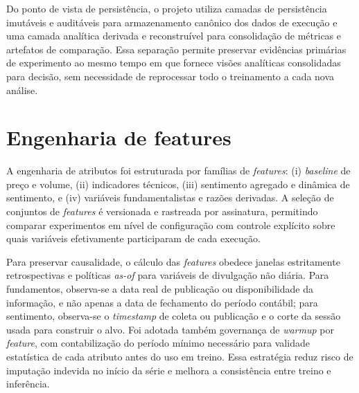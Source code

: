 Do ponto de vista de persistência, o projeto utiliza camadas de persistência imutáveis e auditáveis para armazenamento canônico dos dados de execução e uma camada analítica derivada e reconstruível para consolidação de métricas e artefatos de comparação. Essa separação permite preservar evidências primárias de experimento ao mesmo tempo em que fornece visões analíticas consolidadas para decisão, sem necessidade de reprocessar todo o treinamento a cada nova análise.

\section{Engenharia de features}
A engenharia de atributos foi estruturada por famílias de \textit{features}: (i) \textit{baseline} de preço e volume, (ii) indicadores técnicos, (iii) sentimento agregado e dinâmica de sentimento, e (iv) variáveis fundamentalistas e razões derivadas. A seleção de conjuntos de \textit{features} é versionada e rastreada por assinatura, permitindo comparar experimentos em nível de configuração com controle explícito sobre quais variáveis efetivamente participaram de cada execução.

Para preservar causalidade, o cálculo das \textit{features} obedece janelas estritamente retrospectivas e políticas \textit{as-of} para variáveis de divulgação não diária. Para fundamentos, observa-se a data real de publicação ou disponibilidade da informação, e não apenas a data de fechamento do período contábil; para sentimento, observa-se o \textit{timestamp} de coleta ou publicação e o corte da sessão usada para construir o alvo. Foi adotada também governança de \textit{warmup} por \textit{feature}, com contabilização do período mínimo necessário para validade estatística de cada atributo antes do uso em treino. Essa estratégia reduz risco de imputação indevida no início da série e melhora a consistência entre treino e inferência.

